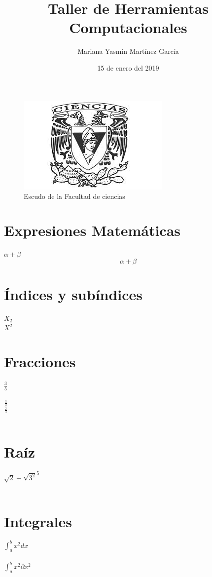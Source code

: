 \documentclass{article}
\title{\Huge Taller de Herramientas Computacionales}
\author{Mariana Yasmin Martínez García}
\date{15 de enero del 2019}
\begin{document}
	\maketitle
	\begin{figure}
		\includegraphics[scale=.5]{Imagenes/1}
		\caption{Escudo de la Facultad de ciencias}
		\label{fig:1}
	\end{figure}	
	\newpage
	\section*{Expresiones Matemáticas}
	$ \alpha + \beta $ \\  %
	\[ \alpha + \beta \] %
	\section*{Índices y subíndices}
	$X_{2}$ \\
	$X^{2}$  \\	
	\section*{Fracciones}
	$\frac{3}{5}$\\ \\
	$\frac{\frac{3}{4}}{\frac{2}{3}}$ \\ \\	
	\section*{Raíz}
	$\sqrt{2} + \sqrt{3^2}^5$ \\ \\ 
	\section*{Integrales}
	$\int_{a}^{b} x^2 dx$ \\ \\
	$\int_{a}^{b} x^2 \partial x^2$ \\ \\
\end{document}
